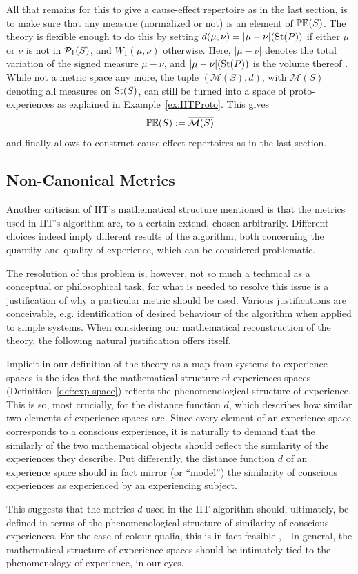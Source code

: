 All that remains for this to give a cause-effect repertoire as in the last section, is to make sure that any measure (normalized or not) is an element of $\mathbb{PE}(S)$. The theory is flexible enough to do this by setting $d(\mu,\nu)=| \mu - \nu | (\text{St}(P))$ if either $\mu$ or $\nu$ is not in $\mathcal P_1(S)$, and $W_1(\mu,\nu)$ otherwise.
Here, $|\mu-\nu|$ denotes the total variation of the signed measure $\mu-\nu$, and $| \mu - \nu | (\text{St}(P))$ is the volume thereof \cite{signedmeasure.encmath,halmos2013measure}. While not a metric space any more, the tuple $(\mathcal M(S), d)$, with $\mathcal M(S)$ denoting all measures on $\text{St}(S)$, can still be turned into a space of proto-experiences as explained in Example~\ref{ex:IITProto}. This gives
\[
\mathbb{PE}(S) := \overline{\mathcal M(S)} 
\]
and finally allows to construct cause-effect repertoires as in the last section.\medskip

\subsection{Non-Canonical Metrics}\label{sec:Non-Canonical}

Another criticism of IIT's mathematical structure mentioned \cite{BarrettMediano.2019} is that the metrics used in IIT's algorithm are, to a certain extend, chosen arbitrarily. Different choices indeed imply different results of the algorithm, both concerning the quantity and quality of experience, which can be considered problematic.

The resolution of this problem is, however, not so much a technical as a conceptual or philosophical task, for what is needed to resolve this issue is a justification of why a particular metric should be used. Various justifications are conceivable, e.g. identification of desired behaviour of the algorithm when applied to simple systems. When considering our mathematical reconstruction of the theory, the following natural justification offers itself.

Implicit in our definition of the theory as a map from systems to experience spaces is the idea that the mathematical structure of experiences spaces (Definition~\ref{def:exp-space}) reflects the phenomenological structure of experience. This is so, most crucially, for the distance function $d$, which describes how similar two elements of experience spaces are. Since every element of an experience space corresponds to a conscious experience, it is naturally to demand that the similarly of the two mathematical objects should reflect the similarity of the experiences they describe. Put differently, the distance function $d$ of an experience space should in fact mirror (or ``model'') the similarity of conscious experiences as experienced by an experiencing subject.

This suggests that the metrics $d$ used in the IIT algorithm should, ultimately, be defined in terms of the phenomenological structure of similarity of conscious experiences. For the case of colour qualia, this is in fact feasible \cite[Example\,3.18]{kleiner2019models}, \cite{Kuehni.2010,SharmaWuDalal.2004}.
In general, the mathematical structure of experience spaces should be intimately tied to the phenomenology of experience, in our eyes.



